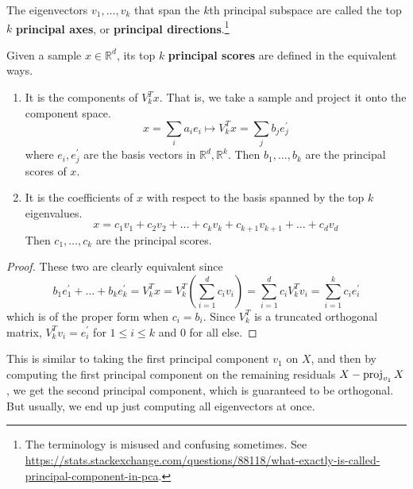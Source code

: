   \begin{definition}
    The eigenvectors $v_1, \ldots, v_k$ that span the $k$th principal subspace are called the top $k$ \textbf{principal axes}, or \textbf{principal directions}.\footnote{The terminology is misused and confusing sometimes. See \href{https://stats.stackexchange.com/questions/88118/what-exactly-is-called-principal-component-in-pca}{https://stats.stackexchange.com/questions/88118/what-exactly-is-called-principal-component-in-pca}.} 
  \end{definition} 
  
  \begin{definition}
    Given a sample $x \in \mathbb{R}^d$, its top $k$ \textbf{principal scores} are defined in the equivalent ways. 
    \begin{enumerate}
      \item It is the components of $V_k^T x$. That is, we take a sample and project it onto the component space. 
      \begin{equation}
        x = \sum_i a_i e_i \mapsto V_k^T x = \sum_j b_j e_j^
        \prime
      \end{equation} 
      where $e_i, e_j^\prime$ are the basis vectors in $\mathbb{R}^d, \mathbb{R}^k$. Then $b_1, \ldots, b_k$ are the principal scores of $x$. 

      \item It is the coefficients of $x$ with respect to the basis spanned by the top $k$ eigenvalues. 
      \begin{equation}
        x = c_1 v_1 + c_2 v_2 + \ldots + c_k v_k + c_{k+1} v_{k+1} + \ldots + c_d v_d
      \end{equation} 
      Then $c_1, \ldots, c_k$ are the principal scores. 
    \end{enumerate}
  \end{definition}
  \begin{proof}
    These two are clearly equivalent since 
    \begin{equation}
      b_1 e_1^\prime + \ldots + b_k e_k^\prime = V_k^T x = V_k^T \left( \sum_{i=1}^d c_i v_i \right) = \sum_{i=1}^d c_i V_k^T v_i = \sum_{i=1}^k c_i e_i^\prime 
    \end{equation} 
    which is of the proper form when $c_i = b_i$. Since $V_k^T$ is a truncated orthogonal matrix, $V_k^T v_i = e_i^\prime$ for $1 \leq i \leq k$ and $0$ for all else. 
  \end{proof}

  This is similar to taking the first principal component $v_1$ on $X$, and then by computing the first principal component on the remaining residuals $X - \operatorname{proj}_{v_1} X$, we get the second principal component, which is guaranteed to be orthogonal. But usually, we end up just computing all eigenvectors at once. 

